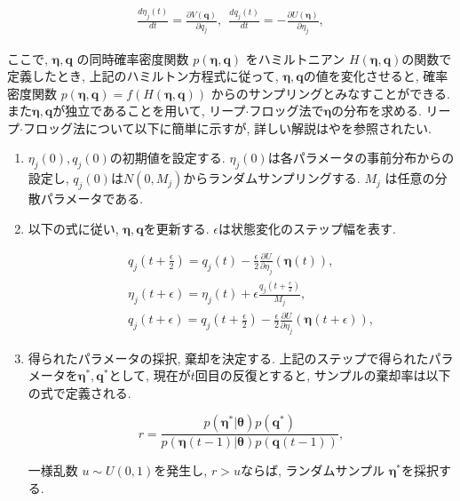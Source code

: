 \documentclass[a4j,12pt]{jarticle}
\begin{document}
\begin{eqnarray}
\label{HMC}
\frac{d \eta_j(t)}{dt} = \frac{\partial V(\bm q)}{\partial q_j},\ \ \frac{d q_j(t)}{dt} = - \frac{\partial U(\bm \eta)}{\partial \eta_j},
\end{eqnarray}

\noindent
ここで, $\bm \eta, \bm q$ の同時確率密度関数 $p(\bm \eta, \bm q)$ をハミルトニアン $H(\bm \eta, \bm q)$の関数で定義したとき, 上記のハミルトン方程式に従って, $\bm \eta, \bm q$の値を変化させると, 確率密度関数 $p(\bm \eta, \bm q) = f(H(\bm \eta, \bm q))$ からのサンプリングとみなすことができる. また$\bm \eta, \bm q$が独立であることを用いて, リープ$\cdot$フロッグ法で$\bm \eta$の分布を求める. リープ$\cdot$フロッグ法について以下に簡単に示すが, 詳しい解説は\citet{HMC}や\citet{NUTS}を参照されたい.

\begin{enumerate}

\item{}
$\eta_j(0), q_j(0)$の初期値を設定する. $\eta_j(0)$は各パラメータの事前分布からの設定し, $q_j(0)$は$N(0,M_j)$からランダムサンプリングする. $M_j$ は任意の分散パラメータである. 
 
\item{}

以下の式に従い, $\bm \eta, \bm q$を更新する. $\epsilon$は状態変化のステップ幅を表す.

\begin{eqnarray*}
&&q_j(t+\frac{\epsilon}{2}) = q_j(t) - \frac{\epsilon}{2} \frac{\partial U}{\partial \eta_j} (\bm \eta(t)), \\
&&\eta_j(t+\epsilon) = \eta_j(t) + \epsilon \frac{q_j(t + \frac{\epsilon}{2})}{M_j}, \\
&&q_j(t+\epsilon) = q_j(t+\frac{\epsilon}{2}) - \frac{\epsilon}{2} \frac{\partial U}{\partial \eta_j} (\bm \eta(t + \epsilon)),
\end{eqnarray*}

\item{}
得られたパラメータの採択, 棄却を決定する. 上記のステップで得られたパラメータを$\bm \eta^*, \bm q^*$として,
現在が$t$回目の反復とすると, サンプルの棄却率は以下の式で定義される.

$$ r = \frac{p(\bm \eta^*|\bm \theta) p(\bm q^*)}{p(\bm \eta(t-1)|\bm \theta) p(\bm q(t-1))},$$

一様乱数 $u \sim U(0,1)$を発生し, $r > u$ならば, ランダムサンプル $\bm \eta^*$を採択する. 

\end{enumerate}
\end{document}
